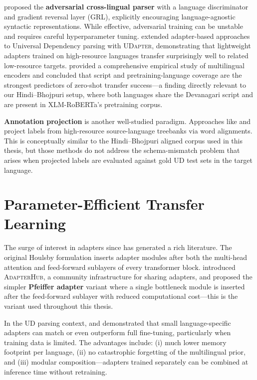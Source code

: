\documentclass[12pt,a4paper,oneside]{report}
\newcommand{\xlmr}{XLM-RoBERTa}
\begin{document}
\citet{ahmad2019cross} proposed the \textbf{adversarial cross-lingual parser} with
a language discriminator and gradient reversal layer (GRL), explicitly encouraging
language-agnostic syntactic representations. While effective, adversarial training
can be unstable and requires careful hyperparameter tuning.
\citet{ustun2020udapter} extended adapter-based approaches to Universal Dependency
parsing with \textsc{UDapter}, demonstrating that lightweight adapters trained on
high-resource languages transfer surprisingly well to related low-resource
targets. \citet{rust2021good} provided a comprehensive empirical study of
multilingual encoders and concluded that script and pretraining-language coverage
are the strongest predictors of zero-shot transfer success---a finding directly
relevant to our Hindi--Bhojpuri setup, where both languages share the Devanagari
script and are present in \xlmr{}'s pretraining corpus.

\textbf{Annotation projection} is another well-studied paradigm. Approaches like
\citet{tackstrom2013token} and \citet{rasooli2017projection} project labels from
high-resource source-language treebanks via word alignments. This is conceptually
similar to the Hindi--Bhojpuri aligned corpus used in this thesis, but those
methods do not address the schema-mismatch problem that arises when projected
labels are evaluated against gold UD test sets in the target language.

\section{Parameter-Efficient Transfer Learning}

The surge of interest in adapters since \citet{houlsby2019parameter} has generated
a rich literature. The original Houlsby formulation inserts adapter modules after
both the multi-head attention and feed-forward sublayers of every transformer
block. \citet{pfeiffer2020adapterhub} introduced \textsc{AdapterHub}, a community
infrastructure for sharing adapters, and proposed the simpler \textbf{Pfeiffer
adapter} variant where a single bottleneck module is inserted after the
feed-forward sublayer with reduced computational cost---this is the variant used
throughout this thesis.

In the UD parsing context, \citet{ustun2020udapter} and \citet{moosavi2021adapter}
demonstrated that small language-specific adapters can match or even outperform
full fine-tuning, particularly when training data is limited. The advantages
include: (i) much lower memory footprint per language, (ii) no catastrophic
forgetting of the multilingual prior, and (iii) modular composition---adapters
trained separately can be combined at inference time without retraining.
\end{document}
